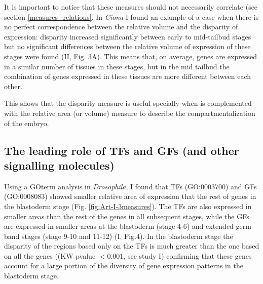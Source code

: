 It is important to notice that these measures should not necessarily correlate (see section \ref{measures_relations}.
%
In \textit{Ciona} I found an example of a case when there is no perfect correspondence between the relative volume and the disparity of expression: disparity increased significantly between early to mid-tailbud stages but no significant differences between the relative volume of expression of these stages were found (II, Fig. 3A).
This means that, on average, genes are expressed in a similar number of tissues in these stages, but in the mid tailbud the combination of genes expressed in these tissues are more different between each other.

This shows that the disparity measure is useful specially when is complemented with the relative area (or volume) measure to describe the compartmentalization of the embryo.


\subsection{The leading role of TFs and GFs (and other signalling molecules)}


Using a GOterm analysis in \textit{Drosophila}, I found that TFs (GO:0003700) and GFs (GO:0008083) showed smaller relative area of expression that the rest of genes in the blastoderm stage (Fig. \ref{fig:Art-I-3measures}).
%
The TFs are also expressed in smaller areas than the rest of the genes in all subsequent stages, while the GFs are expressed in smaller areas at the blastoderm (stage 4-6) and extended germ band stages (stage 9-10 and 11-12) (I, Fig.4). In the blastoderm stage the disparity of the regions based only on the TFs is much greater than the one based on all the genes ((KW pvalue $<0.001$, see study I) confirming that these genes account for a large portion of the diversity of gene expression patterns in the blastoderm stage.

